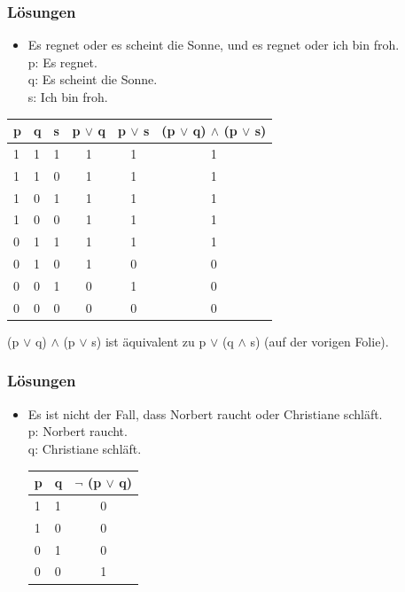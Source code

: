 {\begin{frame}
\begin{itemize}
\end{itemize}

\end{frame}

\begin{frame}
\frametitle{Lösungen}


\begin{itemize}
\item[] Es regnet oder es scheint die Sonne, und es regnet oder ich bin froh.\\
p: Es regnet.\\
q: Es scheint die Sonne.\\
s: Ich bin froh.
\end{itemize}
\begin{tabular}[b]{l|l|l|c|c|c}
p & q & s & p $ \lor $ q & p $ \lor $ s & (p $ \lor $ q) $ \land $ (p $ \lor $ s) \\
\hline
1 & 1 & 1 & 1 & 1 & 1\\
\hline
1 & 1 & 0 & 1 & 1 & 1\\
\hline
1 & 0 & 1 & 1 & 1 & 1\\
\hline
1 & 0 & 0 & 1 & 1 & 1\\
\hline
0 & 1 & 1 & 1 & 1 & 1\\
\hline
0 & 1 & 0 & 1 & 0 & 0\\
\hline
0 & 0 & 1 & 0 & 1 & 0\\
\hline
0 & 0 & 0 & 0 & 0 & 0\\

\end{tabular}

\bigskip

(p $ \lor $ q) $ \land $ (p $ \lor $ s) ist äquivalent zu p $\lor$ (q $\land $ s) (auf der vorigen Folie).

\end{frame}

\begin{frame}
\frametitle{Lösungen}


\begin{itemize}
\item[] Es ist nicht der Fall, dass Norbert raucht oder Christiane schläft.\\
p: Norbert raucht.\\
q: Christiane schläft.

\bigskip

\begin{tabular}{l|l|c}
p & q & $ \lnot $ (p $ \lor$ q)\\
\hline
1 & 1 & 0 \\
\hline
1 & 0 & 0 \\
\hline
0 & 1 & 0 \\
\hline
0 & 0 & 1 \\
\end{tabular}
\end{itemize}



\end{frame}}
